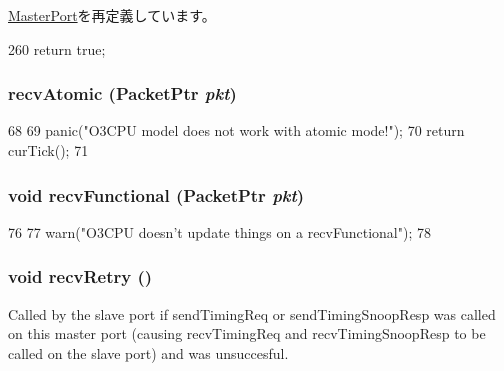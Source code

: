 \hyperlink{classMasterPort_a32602a6a3c3d66a639455036d6c08dd6}{MasterPort}を再定義しています。


\begin{DoxyCode}
260 { return true; }
\end{DoxyCode}
\hypertarget{classOzoneLWLSQ_1_1DcachePort_a5f0b4c4a94f6b0053f9d7a4eb9c2518a}{
\subsubsection[{recvAtomic}]{ recvAtomic ({\bf PacketPtr} {\em pkt})}}
\label{classOzoneLWLSQ_1_1DcachePort_a5f0b4c4a94f6b0053f9d7a4eb9c2518a}



\begin{DoxyCode}
68 {
69     panic("O3CPU model does not work with atomic mode!");
70     return curTick();
71 }
\end{DoxyCode}
\hypertarget{classOzoneLWLSQ_1_1DcachePort_aeefa907fb6d6a787e6dab90e8138ea90}{
\subsubsection[{recvFunctional}]{\setlength{\rightskip}{0pt plus 5cm}void recvFunctional ({\bf PacketPtr} {\em pkt})}}
\label{classOzoneLWLSQ_1_1DcachePort_aeefa907fb6d6a787e6dab90e8138ea90}



\begin{DoxyCode}
76 {
77     warn("O3CPU doesn't update things on a recvFunctional");
78 }
\end{DoxyCode}
\hypertarget{classOzoneLWLSQ_1_1DcachePort_a29cb5a4f98063ce6e9210eacbdb35298}{
\subsubsection[{recvRetry}]{\setlength{\rightskip}{0pt plus 5cm}void recvRetry ()}}
\label{classOzoneLWLSQ_1_1DcachePort_a29cb5a4f98063ce6e9210eacbdb35298}
Called by the slave port if sendTimingReq or sendTimingSnoopResp was called on this master port (causing recvTimingReq and recvTimingSnoopResp to be called on the slave port) and was unsuccesful. 

